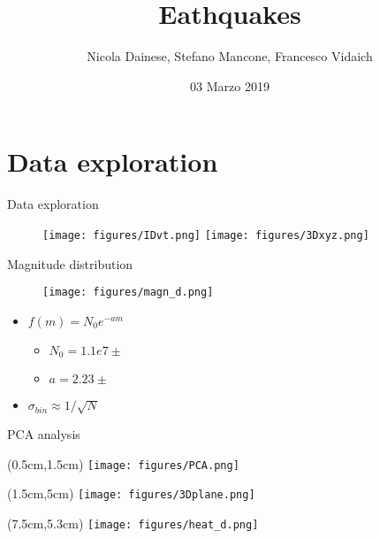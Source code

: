 \documentclass{beamer}
\title{Eathquakes}
\author{Nicola Dainese, Stefano Mancone, Francesco Vidaich}
\date{03 Marzo 2019}
\begin{document}
\maketitle

\section{Data exploration}
\begin{frame}{Data exploration}
 \begin{figure}
  \centering
  \texttt{[image: figures/IDvt.png]}
  \texttt{[image: figures/3Dxyz.png]}\\
 \end{figure}
\end{frame}

\begin{frame}{Magnitude distribution}
 \begin{figure}
  \centering
  \texttt{[image: figures/magn\_d.png]}\\  \end{figure}
 \begin{itemize}
  \item $f(m) = N_0 e ^ {-am}$
        \begin{itemize}
         \item{$N_0 = 1.1e7\pm$}
         \item{$a = 2.23\pm$}
        \end{itemize}
  \item $\sigma_{bin} \approx 1/ \sqrt{N}$
 \end{itemize}
\end{frame}

\begin{frame}{PCA analysis}
 \begin{textblock*}{6.5cm}(0.5cm,1.5cm) %
  \texttt{[image: figures/PCA.png]}\\
 \end{textblock*}
 \begin{textblock*}{5cm}(1.5cm,5cm) %
  \texttt{[image: figures/3Dplane.png]}\\
 \end{textblock*}
 \begin{textblock*}{5cm}(7.5cm,5.3cm) %
  \texttt{[image: figures/heat\_d.png]}\\
 \end{textblock*}
\end{frame}
\end{document}
